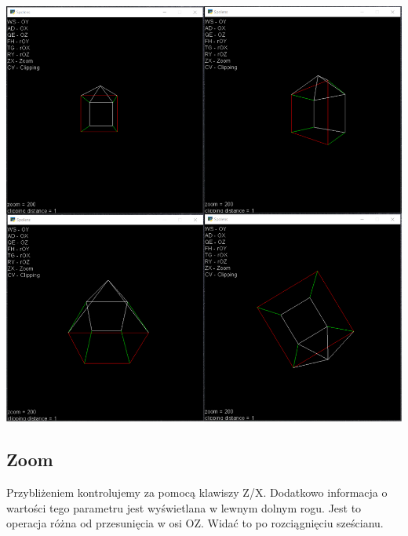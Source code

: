 \documentclass[12pt]{article}
\begin{document}
\begin{center}
    \noindent\includegraphics[scale=0.5]{spolens rot.png}
\end{center}

\newpage
\subsection{Zoom}
Przybliżeniem kontrolujemy za pomocą klawiszy Z/X. Dodatkowo informacja o wartości tego parametru jest wyświetlana w lewnym dolnym rogu. Jest to operacja różna od przesunięcia w osi OZ. Widać to po rozciągnięciu sześcianu.
\end{document}
